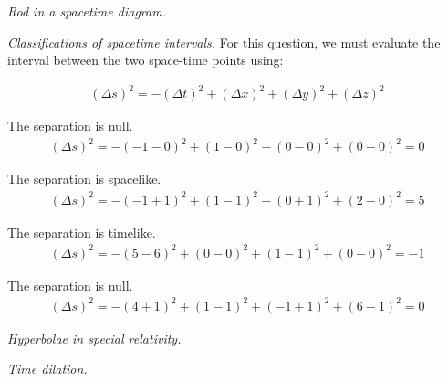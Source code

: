 \documentclass{report}
\begin{document}
\begin{subquests}
\begin{subquests}
		\item

		\item
	\end{subquests}

	\item \emph{Rod in a spacetime diagram.}

	\item \emph{Classifications of spacetime intervals.}
	For this question, we must evaluate the interval between the two space-time points using:
	\begin{subquests}
		\item
		\begin{gather*}
			(\Delta{s})^2 = -(\Delta{t})^2 + (\Delta{x})^2 + (\Delta{y})^2 + (\Delta{z})^2
		\end{gather*}
		
		The separation is null.
		\begin{gather*}
			(\Delta{s})^2 = -(-1-0)^2 + (1-0)^2 + (0-0)^2 + (0-0)
			^2 = 0
		\end{gather*}
		
		\item
		The separation is spacelike.
		\begin{gather*}
			(\Delta{s})^2 = -(-1+1)^2 + (1-1)^2 + (0+1)^2 + (2-0)^2 = 5
		\end{gather*}
		
		\item
		The separation is timelike.
		\begin{gather*}
			(\Delta{s})^2 = -(5-6)^2 + (0-0)^2 + (1-1)^2 + (0-0)^2 = -1
		\end{gather*}
		
		\item
		The separation is null.
		\begin{gather*}
			(\Delta{s})^2 = -(4+1)^2 + (1-1)^2 + (-1+1)^2 + (6-1)^2 = 0
		\end{gather*}
	\end{subquests}

	\item \emph{Hyperbolae in special relativity.}

	\item \emph{Time dilation.}
	\begin{subquests}
		\item

		\item

		\item
	\end{subquests}


\end{subquests}
\end{document}
